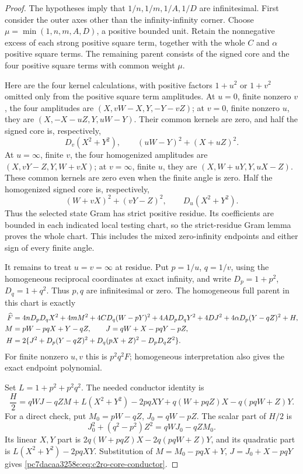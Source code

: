 \begin{proof}
The hypotheses imply that $1/n,1/m,1/A,1/D$ are infinitesimal.
First consider the outer axes other than the infinity-infinity corner.
Choose $\mu=\min(1,n,m,A,D)$, a positive bounded unit.  Retain the
nonnegative excess of each strong positive square term, together with the whole
$C$ and $\alpha$ positive square terms.  The remaining parent consists of the signed
core and the four positive square terms with common weight $\mu$.

Here are the four kernel calculations, with positive factors
$1+u^2$ or $1+v^2$ omitted only from the positive square term amplitudes.
At $u=0$, finite nonzero $v$, the four amplitudes are
$(X,vW-X,Y,-Y-vZ)$; at $v=0$, finite nonzero $u$, they are
$(X,-X-uZ,Y,uW-Y)$.  Their common kernels are zero, and half the
signed core is, respectively,
\[
 D_v(X^2+Y^2),\qquad (uW-Y)^2+(X+uZ)^2.
\]
At $u=\infty$, finite $v$, the four homogenized amplitudes are
$(X,vY-Z,Y,W+vX)$; at $v=\infty$, finite $u$, they are
$(X,W+uY,Y,uX-Z)$.  These common kernels are zero even when the
finite angle is zero.  Half the homogenized signed core is, respectively,
\[
 (W+vX)^2+(vY-Z)^2,\qquad D_u(X^2+Y^2).
\]
Thus the selected state Gram has strict positive residue.  Its
coefficients are bounded in each indicated local testing chart, so the
strict-residue Gram lemma proves the whole chart.  This includes the
mixed zero-infinity endpoints and either sign of every finite angle.

It remains to treat $u=v=\infty$ at residue.  Put $p=1/u$, $q=1/v$,
using the homogeneous reciprocal coordinates at exact infinity, and
write $D_p=1+p^2$, $D_q=1+q^2$.  Thus $p,q$ are infinitesimal or zero.
The homogeneous full parent in this chart is exactly
\begin{align}
\widehat F={}&4nD_pD_qX^2+4mM^2+4CD_q(W-pY)^2
       +4AD_pD_qY^2+4DJ^2+4\alpha D_p(Y-qZ)^2+H,\notag\\
 M={}&pW-pqX+Y-qZ,\qquad
 J=qW+X-pqY-pZ,\notag\\
 H={}&2\{J^2+D_p(Y-qZ)^2+D_q(pX+Z)^2-D_pD_qZ^2\}.
\label{pc7dacaa3258e:eq:c2ro-parent}
\end{align}
For finite nonzero $u,v$ this is $p^2q^2F$; homogeneous interpretation
also gives the exact endpoint polynomial.

Set $L=1+p^2+p^2q^2$.  The needed conductor identity is
\begin{equation}
\frac H2=qWJ-qZM+L(X^2+Y^2)-2pqXY
             +q(W+pqZ)X-q(pqW+Z)Y.
\label{pc7dacaa3258e:eq:c2ro-core-conductor}
\end{equation}
For a direct check, put $M_0=pW-qZ$, $J_0=qW-pZ$.  The scalar part
of $H/2$ is
\[
 J_0^2+(q^2-p^2)Z^2=qWJ_0-qZM_0.
\]
Its linear $X,Y$ part is
$2q(W+pqZ)X-2q(pqW+Z)Y$, and its quadratic part is
$L(X^2+Y^2)-2pqXY$.  Substitution of
$M=M_0-pqX+Y$, $J=J_0+X-pqY$ gives
\eqref{pc7dacaa3258e:eq:c2ro-core-conductor}.


\end{proof}
